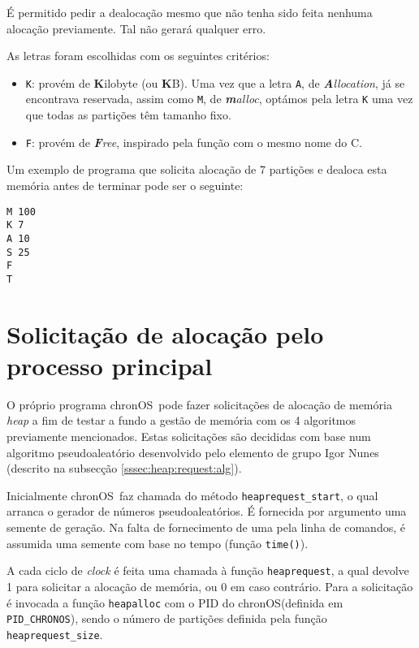 \documentclass[10pt,oneside]{estiloUBI}
\newcommand{\chronOS}{\textsf{chronOS}}
\begin{document}
	É permitido pedir a dealocação mesmo que não tenha sido feita nenhuma alocação previamente. Tal não gerará qualquer erro.
	
	As letras foram escolhidas com os seguintes critérios:
	
	\begin{itemize}
		\item \verb|K|: provém de \textbf{K}ilobyte (ou \textbf{K}B). Uma vez que a letra \verb|A|, de \textit{\textbf{A}llocation}, já se encontrava reservada, assim como \verb|M|, de \textit{\textbf{m}alloc}, optámos pela letra \verb|K| uma vez que todas as partições têm tamanho fixo.
		
		\item \verb|F|: provém de \textit{\textbf{F}ree}, inspirado pela função com o mesmo nome do C.
	\end{itemize}

	Um exemplo de programa que solicita alocação de 7 partições e dealoca esta memória antes de terminar pode ser o seguinte:
	
	\begin{verbatim}
M 100
K 7
A 10
S 25
F
T
	\end{verbatim}
	
	
	\section{Solicitação de alocação pelo processo principal}
	\label{ssec:heap:request}
	
	O próprio programa \chronOS~pode fazer solicitações de alocação de memória \textit{heap} a fim de testar a fundo a gestão de memória com os 4 algoritmos previamente mencionados. Estas solicitações são decididas com base num algoritmo pseudoaleatório desenvolvido pelo elemento de grupo Igor Nunes (descrito na subsecção \ref{sssec:heap:request:alg}).
	
	Inicialmente \chronOS~faz chamada do método \verb|heaprequest_start|, o qual arranca o gerador de números pseudoaleatórios. É fornecida por argumento uma semente de geração. Na falta de fornecimento de uma pela linha de comandos, é assumida uma semente com base no tempo (função \verb|time()|).
	
	A cada ciclo de \textit{clock} é feita uma chamada à função \verb|heaprequest|, a qual devolve 1 para solicitar a alocação de memória, ou 0 em caso contrário. Para a solicitação é invocada a função \verb|heapalloc| com o PID do \chronOS (definida em \verb|PID_CHRONOS|), sendo o número de partições definida pela função \verb|heaprequest_size|.
	
\end{document}
